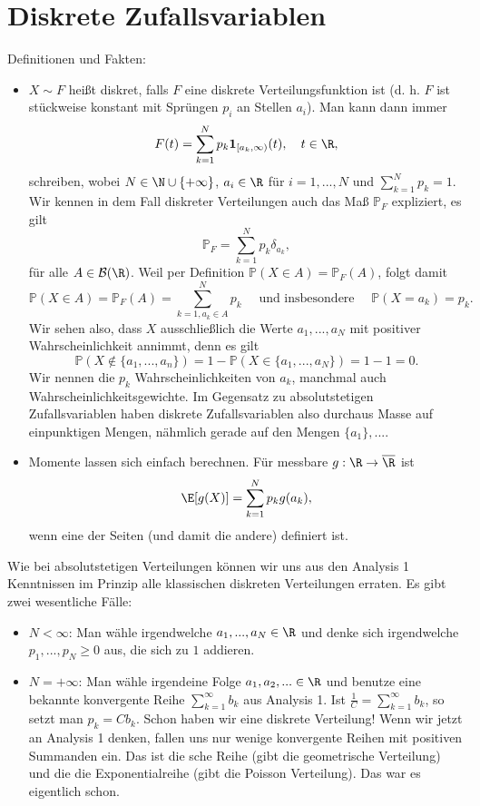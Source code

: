 \section{Diskrete Zufallsvariablen}
Definitionen und Fakten:
\begin{itemize}
	\item $X\sim F$ hei\ss t diskret, falls $F$ eine diskrete Verteilungsfunktion ist (d. h. $F$ ist st\"uckweise konstant mit Spr\"ungen $p_i$ an Stellen $a_i$). Man kann dann immer $$F(t)=\sum_{k=1}^N p_k \mathbf 1_{[a_k,\infty)}(t),\quad t\in\R,$$ schreiben, wobei $N\in \N\cup \{+\infty\}$, $a_i\in\R$ f\"ur $i=1,...,N$ und $\sum_{k=1}^N p_k=1$. Wir kennen in dem Fall diskreter Verteilungen auch das Ma\ss{} $\mathbb P_F$ expliziert, es gilt
	$$\mathbb P_F=\sum_{k=1}^N p_k \delta_{a_k},$$ f\"ur alle $A\in \mathcal B(\R)$. Weil per Definition $\mathbb P(X\in A)=\mathbb P_F(A)$, folgt damit
	 $$\mathbb P(X\in A)=\mathbb P_F(A)=\sum_{k=1, a_k\in A}^N p_k\quad \text{ und insbesondere }\quad \mathbb P(X=a_k)=p_k.$$
	Wir sehen also, dass $X$ ausschlie\ss lich die Werte $a_1,...,a_N$ mit positiver Wahrscheinlichkeit annimmt, denn es gilt
	$$\mathbb P(X\notin \{a_1,...,a_n\})=1-\mathbb P(X\in \{a_1,...,a_N\})=1-1=0.$$	
	Wir nennen die $p_k$ Wahrscheinlichkeiten von $a_k$, manchmal auch Wahrscheinlichkeitsgewichte. Im Gegensatz zu absolutstetigen Zufallsvariablen haben diskrete Zufallsvariablen also durchaus Masse auf einpunktigen Mengen, n\"ahmlich gerade auf den Mengen $\{a_1\}, ...$.
	\item Momente lassen sich einfach berechnen. F\"ur messbare $g:\R\to \overline \R$ ist
	\begin{align*}
		\E[g(X)]=\sum_{k=1}^N p_k g(a_k),
	\end{align*}
	wenn eine der Seiten (und damit die andere) definiert ist.
\end{itemize}
Wie bei absolutstetigen Verteilungen k\"onnen wir uns aus den Analysis 1 Kenntnissen im Prinzip alle klassischen diskreten Verteilungen erraten. Es gibt zwei wesentliche F\"alle:
\begin{itemize}
	\item $N<\infty$: Man w\"ahle irgendwelche $a_1,...,a_N\in\R$ und denke sich irgendwelche $p_1,...,p_N \geq 0$ aus, die sich zu $1$ addieren.
	\item $N=+\infty$: Man w\"ahle irgendeine Folge $a_1,a_2,...\in \R$ und benutze eine bekannte konvergente Reihe $\sum_{k=1}^\infty b_k$ aus Analysis 1. Ist $\frac 1 C=\sum_{k=1}^\infty b_k$, so setzt man $p_k=Cb_k$. Schon haben wir eine diskrete Verteilung! Wenn wir jetzt an Analysis 1 denken, fallen uns nur wenige konvergente Reihen mit positiven Summanden ein. Das ist die 
	sche Reihe (gibt die geometrische Verteilung) und die die Exponentialreihe (gibt die Poisson Verteilung). Das war es eigentlich schon.
\end{itemize}



